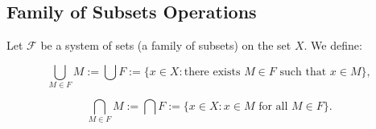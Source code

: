 \subsection{Family of Subsets Operations}
Let $\mathscr{F}$ be a system of sets (a family of subsets) on the set \( X \). We define:

\[
	\bigcup_{M \in F} M := \bigcup F := \{ x \in X : \text{there exists } M \in F \text{ such that } x \in M \} ,
\]

\[
	\bigcap_{M \in F} M := \bigcap F := \{ x \in X : x \in M \text{ for all } M \in F \} .
\]
\newpage